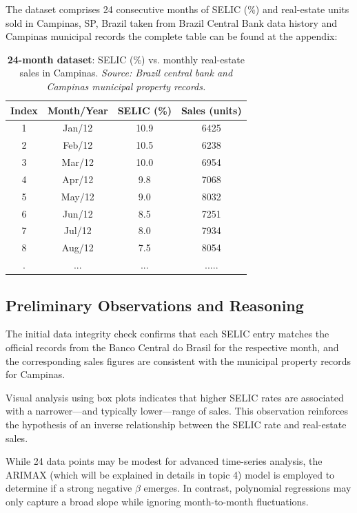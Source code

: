 \documentclass[10pt]{article}
\begin{document}
The dataset comprises 24 consecutive months of SELIC (\%) and real-estate units sold in Campinas, SP, Brazil taken from Brazil Central Bank data history and Campinas municipal records the complete table can be found at the appendix:

\begin{table}[H]
\centering
\begin{tabular}{cccc}
\toprule
\textbf{Index} & \textbf{Month/Year} & \textbf{SELIC (\%)} & \textbf{Sales (units)} \\
\midrule
1  & Jan/12 & 10.9 & 6425\\
2  & Feb/12 & 10.5 & 6238\\
3  & Mar/12 & 10.0 & 6954\\
4  & Apr/12 & 9.8  & 7068\\
5  & May/12 & 9.0  & 8032\\
6  & Jun/12 & 8.5  & 7251\\
7  & Jul/12 & 8.0  & 7934\\
8  & Aug/12 & 7.5  & 8054\\
.  & ... & ... & .....\\

\bottomrule
\end{tabular}
\caption{\textbf{24-month dataset}: SELIC (\%) vs. monthly real-estate sales in Campinas. \emph{Source: Brazil central bank and Campinas municipal property records.}}
\label{tab:dataset24}
\end{table}

\subsection{Preliminary Observations and Reasoning}

The initial data integrity check confirms that each SELIC entry matches the official records from the Banco Central do Brasil for the respective month, and the corresponding sales figures are consistent with the municipal property records for Campinas.

Visual analysis using box plots indicates that higher SELIC rates are associated with a narrower—and typically lower—range of sales. This observation reinforces the hypothesis of an inverse relationship between the SELIC rate and real-estate sales.

While 24 data points may be modest for advanced time-series analysis, the ARIMAX (which will be explained in details in topic 4) model is employed to determine if a strong negative \(\beta\) emerges. In contrast, polynomial regressions may only capture a broad slope while ignoring month-to-month fluctuations.
\end{document}
